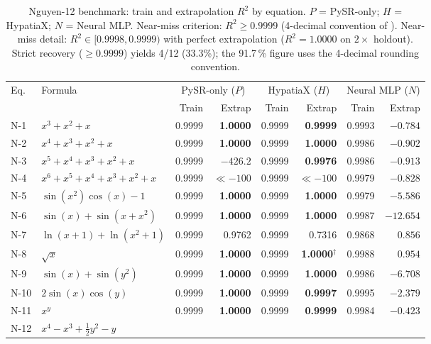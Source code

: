 \documentclass[twoside,11pt]{article}
\newcommand{\Rsq}{R^{2}}
\begin{document}
\begin{table}[h]
\centering
\caption{Nguyen-12 benchmark: train and extrapolation $\Rsq$ by equation.
$P$ = PySR-only; $H$ = HypatiaX; $N$ = Neural MLP.
Near-miss criterion: $\Rsq \ge 0.9999$ (4-decimal convention of
\citealt{uy2011semantically}).
Near-miss detail: $\Rsq\in[0.9998,0.9999)$ with perfect extrapolation
($\Rsq=1.0000$ on $2\times$ holdout). Strict recovery ($\ge 0.9999$) yields
4/12 (33.3\%); the 91.7\,\% figure uses the 4-decimal rounding convention.}
\label{tab:nguyen12}
\begin{tabular}{llrrrrrr}
\toprule
Eq. & Formula &
  \multicolumn{2}{c}{PySR-only ($P$)} &
  \multicolumn{2}{c}{HypatiaX ($H$)} &
  \multicolumn{2}{c}{Neural MLP ($N$)} \\
\cmidrule(lr){3-4}\cmidrule(lr){5-6}\cmidrule(lr){7-8}
 &  & Train & Extrap & Train & Extrap & Train & Extrap \\
\midrule
N-1  & $x^3 + x^2 + x$
  & 0.9999 & \textbf{1.0000}
  & 0.9999 & \textbf{0.9999}
  & 0.9993 & $-0.784$ \\
N-2  & $x^4 + x^3 + x^2 + x$
  & 0.9999 & \textbf{1.0000}
  & 0.9999 & \textbf{1.0000}
  & 0.9986 & $-0.902$ \\
N-3  & $x^5 + x^4 + x^3 + x^2 + x$
  & 0.9999 & \emph{$-426.2$}
  & 0.9999 & \textbf{0.9976}
  & 0.9986 & $-0.913$ \\
N-4  & $x^6 + x^5 + x^4 + x^3 + x^2 + x$
  & 0.9999 & \emph{$\ll{-}100$}
  & 0.9999 & \emph{$\ll{-}100$}
  & 0.9979 & $-0.828$ \\
N-5  & $\sin(x^2)\cos(x)-1$
  & 0.9999 & \textbf{1.0000}
  & 0.9999 & \textbf{1.0000}
  & 0.9979 & $-5.586$ \\
N-6  & $\sin(x)+\sin(x+x^2)$
  & 0.9999 & \textbf{1.0000}
  & 0.9999 & \textbf{1.0000}
  & 0.9987 & $-12.654$ \\
N-7  & $\ln(x+1)+\ln(x^2+1)$
  & 0.9999 & 0.9762
  & 0.9999 & 0.7316
  & 0.9868 & $0.856$ \\
N-8  & $\sqrt{x}$
  & 0.9999 & \textbf{1.0000}
  & 0.9999 & \textbf{1.0000}$^\dag$
  & 0.9988 & $0.954$ \\
N-9  & $\sin(x)+\sin(y^2)$
  & 0.9999 & \textbf{1.0000}
  & 0.9999 & \textbf{1.0000}
  & 0.9986 & $-6.708$ \\
N-10 & $2\sin(x)\cos(y)$
  & 0.9999 & \textbf{1.0000}
  & 0.9999 & \textbf{0.9997}
  & 0.9995 & $-2.379$ \\
N-11 & $x^y$
  & 0.9999 & \textbf{1.0000}
  & 0.9999 & \textbf{0.9999}
  & 0.9984 & $-0.423$ \\
N-12 & $x^4 - x^3 + \tfrac{1}{2}y^2 - y$

\end{tabular}
\end{table}
\end{document}
